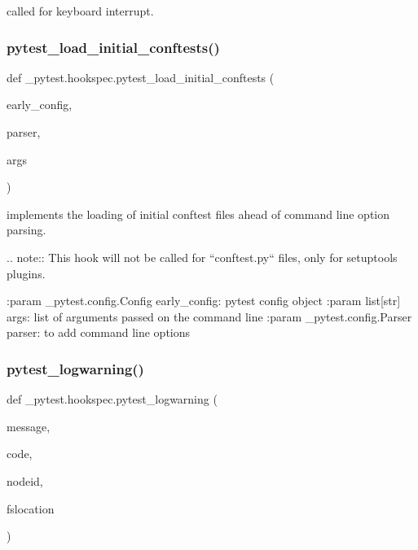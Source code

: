 \begin{DoxyVerb}called for keyboard interrupt. \end{DoxyVerb}
 \mbox{\label{namespace__pytest_1_1hookspec_adb9da3b511a00e7f4bfdb66739ce0990}} 
\subsubsection{\texorpdfstring{pytest\+\_\+load\+\_\+initial\+\_\+conftests()}{pytest\_load\_initial\_conftests()}}
{\footnotesize\ttfamily def \+\_\+pytest.\+hookspec.\+pytest\+\_\+load\+\_\+initial\+\_\+conftests (\begin{DoxyParamCaption}\item[{}]{early\+\_\+config,  }\item[{}]{parser,  }\item[{}]{args }\end{DoxyParamCaption})}

\begin{DoxyVerb}implements the loading of initial conftest files ahead
of command line option parsing.

.. note::
    This hook will not be called for ``conftest.py`` files, only for setuptools plugins.

:param _pytest.config.Config early_config: pytest config object
:param list[str] args: list of arguments passed on the command line
:param _pytest.config.Parser parser: to add command line options
\end{DoxyVerb}
 \mbox{\label{namespace__pytest_1_1hookspec_aa931d0e6af8083dfecc91f0ea7d3e13a}} 
\subsubsection{\texorpdfstring{pytest\+\_\+logwarning()}{pytest\_logwarning()}}
{\footnotesize\ttfamily def \+\_\+pytest.\+hookspec.\+pytest\+\_\+logwarning (\begin{DoxyParamCaption}\item[{}]{message,  }\item[{}]{code,  }\item[{}]{nodeid,  }\item[{}]{fslocation }\end{DoxyParamCaption})}

